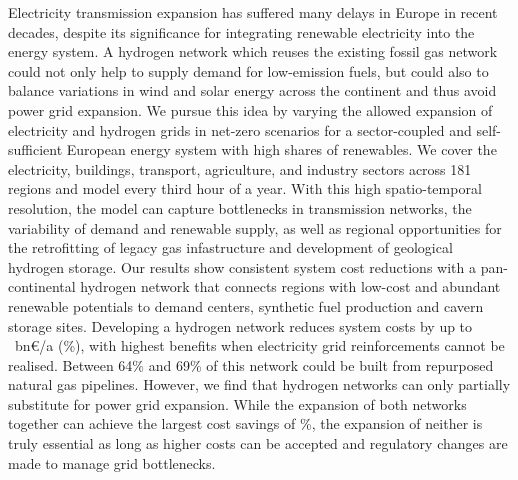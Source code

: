 Electricity transmission expansion has suffered many delays in Europe in recent
decades, despite its significance for integrating renewable electricity into the
energy system. A hydrogen network which reuses the existing fossil gas network
could not only help to supply demand for low-emission fuels, but could also to
balance variations in wind and solar energy across the continent and thus avoid
power grid expansion. We pursue this idea by varying the allowed expansion of
electricity and hydrogen grids in net-zero \co scenarios for a sector-coupled
and self-sufficient European energy system with high shares of renewables. We
cover the electricity, buildings, transport, agriculture, and industry sectors
across 181 regions and model every third hour of a year. With this high
spatio-temporal resolution, the model can capture bottlenecks in transmission
networks, the variability of demand and renewable supply, as well as regional
opportunities for the retrofitting of legacy gas infastructure and development
of geological hydrogen storage. Our results show consistent system cost
reductions with a pan-continental hydrogen network that connects regions with
low-cost and abundant renewable potentials to demand centers, synthetic fuel
production and cavern storage sites. Developing a hydrogen network reduces
system costs by up to \maxhybenefitabs~bn\euro/a (\maxhybenefitrel\%), with
highest benefits when electricity grid reinforcements cannot be realised.
Between 64\% and 69\% of this network could be built from repurposed natural gas
pipelines. However, we find that hydrogen networks can only partially substitute
for power grid expansion. While the expansion of both networks together can
achieve the largest cost savings of \gridbenefitrel\%, the expansion of neither
is truly essential as long as higher costs can be accepted and regulatory
changes are made to manage grid bottlenecks.

